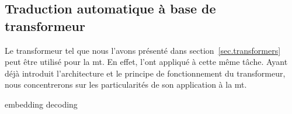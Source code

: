 \subsection{Traduction automatique à base de transformeur}
\label{subsec.nmt-transformer}

Le transformeur tel que nous l'avons présenté dans section~\ref{sec.transformers}
peut être utilisé pour la \gls{mt}.
En effet, \cite{attention} l'ont appliqué à cette même tâche.
Ayant déjà introduit l'architecture et le principe de fonctionnement du transformeur,
nous concentrerons sur les particularités de son application à la \gls{mt}.

{embedding}
{decoding}